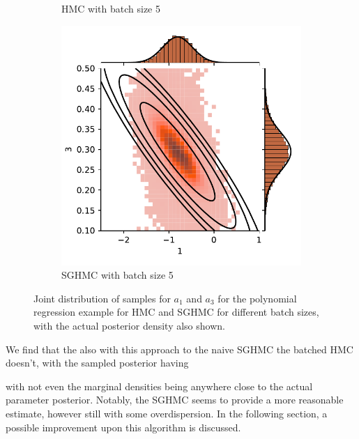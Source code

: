 \begin{figure}[htbp]
\begin{subfigure}[b]{0.4\textwidth}
        \caption{HMC with batch size 5}
    \end{subfigure}
    \begin{subfigure}[b]{0.4\textwidth}
        \centering
        \includegraphics[width=\textwidth]{Figures/simulated_joint_SGHMC_5.pdf} 
        \caption{SGHMC with batch size 5}
    \end{subfigure}
    \caption{Joint distribution of samples for $a_1$ and $a_3$ for the polynomial regression example for HMC and SGHMC for different batch sizes, with the actual posterior density also shown.}
    \label{fig:simulated_joint_comp}
\end{figure}
We find that the also with this approach to the naive SGHMC the batched HMC doesn't, with the sampled posterior having 

with not even the marginal densities being anywhere close to the actual parameter posterior.
Notably, the SGHMC seems to provide a more reasonable estimate, however still with some overdispersion.
In the following section, a possible improvement upon this algorithm is discussed.

